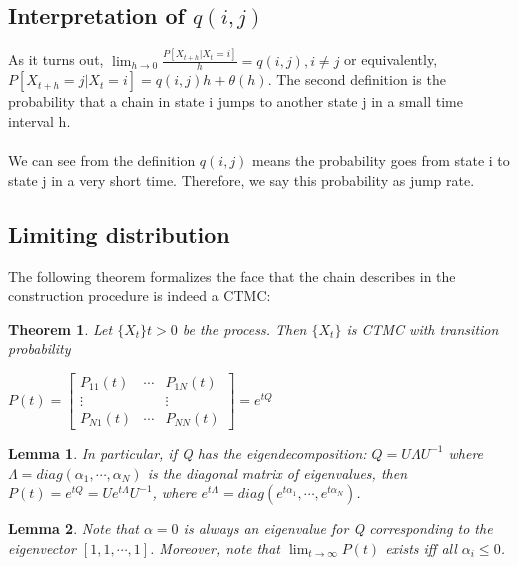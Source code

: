 \documentclass[12pt]{article}
\newtheorem{theorem}{Theorem}
\newtheorem{lemma}{Lemma}
\begin{document}
\subsection{Interpretation of $q(i,j)$}

As it turns out, $\lim_{h  \to 0} \frac{P[X_{t+h}|X_t=i]}{h}=q(i,j), i\ne j$ or equivalently, $P[X_{t+h}=j|X_t=i]=q(i,j)h+\theta(h)$. The second definition is the probability that a chain in state i jumps to another state j in a small time interval h.
\\
\\We can see from the definition $q(i,j)$ means the probability goes from state i to state j in a very short time. Therefore, we say this probability as jump rate.

\subsection{Limiting distribution}

The following theorem formalizes the face that the chain describes in the construction procedure is indeed a CTMC:

\begin{theorem}
    Let $\{X_t\}t>0$ be the process. Then $\{X_t\}$ is CTMC with transition probability
    \begin{center}
        $P(t) = \begin{bmatrix}
         P_{11}(t) & \cdots & P_{1N}(t) \\
         \vdots &  & \vdots \\
         P_{N1}(t) & \cdots & P_{NN}(t)
        \end{bmatrix} = e^{tQ}$
    \end{center}
\end{theorem}

\begin{lemma}
    In particular, if Q has the eigendecomposition: $Q = U\Lambda U^{-1}$ where $\Lambda = diag(\alpha_1, \cdots, \alpha_N)$ is the diagonal matrix of eigenvalues, then $P(t) = e^{tQ} = Ue^{t\Lambda}U^{-1}$, where $e^{t\Lambda}=diag(e^{t\alpha_1}, \cdots, e^{t\alpha_N})$.
\end{lemma}

\begin{lemma}
    Note that $\alpha = 0$ is always an eigenvalue for Q corresponding to the eigenvector $[1,1, \cdots, 1]$. Moreover, note that $\lim_{t \to \infty}P(t)$ exists iff all $\alpha_i \leq 0$.
\end{lemma}
\end{document}
